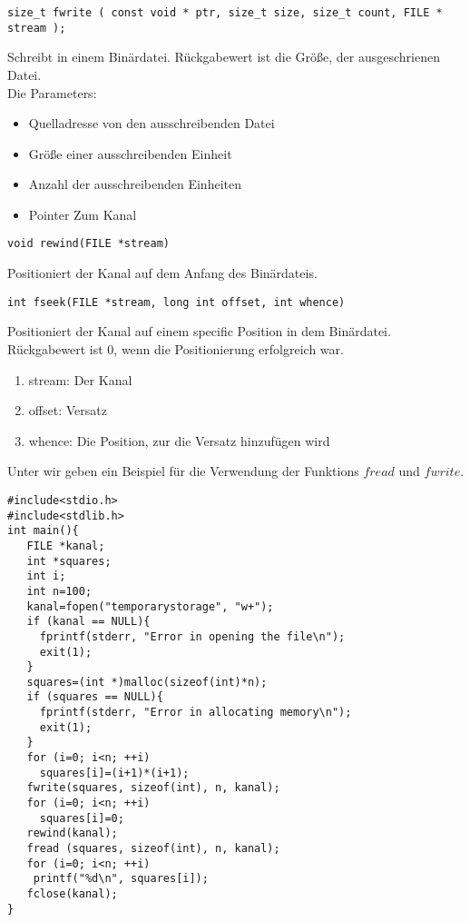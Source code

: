 \documentclass{article}[12pt]
\newenvironment{myexampleblock}[1]{%
    \tcolorbox[beamer,%
    noparskip,breakable,
    colback=White,colframe=ForestGreen,%
    colbacklower=LimeGreen!75!White,%
    title=#1]}%
    {\endtcolorbox}
\begin{document}
\begin{myexampleblock}{Funktion: \texttt{fwrite}}
\begin{lstlisting}
size_t fwrite ( const void * ptr, size_t size, size_t count, FILE * stream );
\end{lstlisting}
\vspace{-0.4cm}
Schreibt in einem Binärdatei. Rückgabewert ist die Größe, der ausgeschrienen
Datei.\\ Die Parameters:
\begin{itemize}
\item Quelladresse von den ausschreibenden Datei 
\item Größe einer ausschreibenden Einheit
\item Anzahl der ausschreibenden Einheiten
\item Pointer Zum Kanal
\end{itemize}
\end{myexampleblock}
\begin{myexampleblock}{Funktion: \texttt{rewind}}
\begin{lstlisting}
void rewind(FILE *stream)
\end{lstlisting}
\vspace{-0.4cm}
Positioniert der Kanal auf dem Anfang des Binärdateis.
\end{myexampleblock}
\begin{myexampleblock}{Funktion: \texttt{fseek}}
\begin{lstlisting}
int fseek(FILE *stream, long int offset, int whence)
\end{lstlisting}
\vspace{-0.4cm}
Positioniert der Kanal auf einem specific Position in dem 
Binärdatei. Rückgabewert ist 0, wenn die Positionierung erfolgreich war.
\begin{enumerate}
\item stream: Der Kanal
\item offset: Versatz
\item whence: Die Position, zur die Versatz hinzufügen wird
\end{enumerate}
\end{myexampleblock}
Unter wir geben ein Beispiel für die Verwendung der Funktions $fread$ und $fwrite$.
\begin{lstlisting}
#include<stdio.h>
#include<stdlib.h>
int main(){
   FILE *kanal;
   int *squares;
   int i;
   int n=100;
   kanal=fopen("temporarystorage", "w+");
   if (kanal == NULL){
     fprintf(stderr, "Error in opening the file\n");
     exit(1);
   }
   squares=(int *)malloc(sizeof(int)*n);
   if (squares == NULL){
     fprintf(stderr, "Error in allocating memory\n");
     exit(1);
   }
   for (i=0; i<n; ++i)
     squares[i]=(i+1)*(i+1);
   fwrite(squares, sizeof(int), n, kanal);
   for (i=0; i<n; ++i)
     squares[i]=0;
   rewind(kanal); 
   fread (squares, sizeof(int), n, kanal);
   for (i=0; i<n; ++i)
    printf("%d\n", squares[i]);
   fclose(kanal);
}   
\end{lstlisting}
\end{document}
